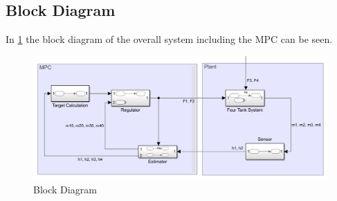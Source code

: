 \subsection{Block Diagram}
In \cref{fig:BlockDiagram} the block diagram of the overall system including the MPC can be seen.
\begin{figure}[H]
    \centering
    \includegraphics[width=1\textwidth]{Figures/BlockDiagram.PNG}
    \caption{Block Diagram}
    \label{fig:BlockDiagram}
\end{figure}